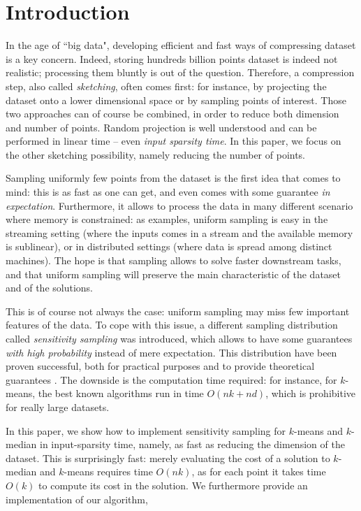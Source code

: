 \section{Introduction}

In the age of ``big data", developing efficient and fast ways of compressing dataset is a key concern. Indeed, storing hundreds billion points dataset is indeed not realistic; processing them bluntly is out of the question. 
Therefore, a compression step, also called \textit{sketching}, often comes first: for instance, by projecting the dataset onto a lower dimensional space or by sampling points of interest. Those two approaches can of course be combined, in order to reduce both dimension and number of points. 
Random projection is well understood and can be performed in linear time -- even \textit{input sparsity time}. 
In this paper, we focus on the other sketching possibility, namely reducing the number of points.

Sampling uniformly few points from the dataset is the first idea that comes to mind: this is as fast as one can get, and even comes with some guarantee \emph{in expectation}. 
Furthermore, it allows to process the data in many different scenario where memory is constrained: as examples, uniform sampling is easy in the streaming setting (where the inputs comes in a stream and the available memory is sublinear), or in distributed settings (where data is spread among distinct machines).
The hope is that sampling allows to solve faster downstream tasks, and that uniform sampling will preserve the main characteristic of the dataset and of the solutions.

This is of course not always the case: uniform sampling may miss few important features of the data. 
To cope with this issue, a different sampling distribution called \textit{sensitivity sampling} was introduced, which allows to have some guarantees \textit{with high probability} instead of mere expectation.
This distribution have been proven successful, both for practical purposes \cite{} and to provide theoretical guarantees \cite{}. 
The downside is the computation time required: for instance, for $k$-means, the best known algorithms run in time $O(nk+nd)$, which is prohibitive for really large datasets.


In this paper, we show how to implement sensitivity sampling for $k$-means and $k$-median in input-sparsity time, namely, as fast as reducing the dimension of the dataset. 
This is surprisingly fast: merely evaluating the cost of a solution to $k$-median and $k$-means requires time $O(nk)$, as for each point it takes time $O(k)$ to compute its cost in the solution. 
We furthermore provide an implementation of our algorithm, 



